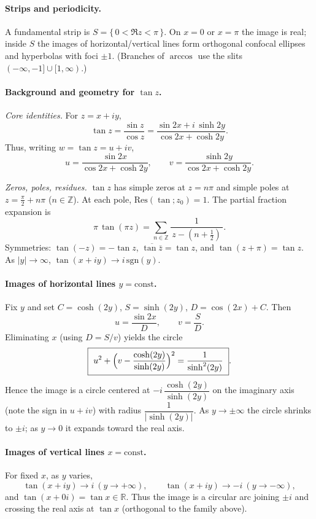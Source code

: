 \documentclass[11pt,a4paper]{article}
\theoremstyle{definition}
\theoremstyle{definition}
\theoremstyle{plain}
\theoremstyle{remark}
\begin{document}
\medskip
\paragraph{Strips and periodicity.}
A fundamental strip is $S=\{\,0<\Re z<\pi\,\}$. On $x=0$ or $x=\pi$ the image is real; inside $S$ the images of horizontal/vertical lines form orthogonal confocal ellipses and hyperbolas with foci $\pm1$.
(Branches of $\arccos$ use the slits $(-\infty,-1]\cup[1,\infty)$.)
	
	
\paragraph{Background and geometry for $\tan z$.}

\emph{Core identities.} For $z=x+iy$,
\[
\tan z=\frac{\sin z}{\cos z}
=\frac{\sin 2x + i\,\sinh 2y}{\cos 2x+\cosh 2y}.
\]
Thus, writing $w=\tan z=u+iv$,
\[
u=\frac{\sin 2x}{\cos 2x+\cosh 2y},\qquad
v=\frac{\sinh 2y}{\cos 2x+\cosh 2y}.
\]

\emph{Zeros, poles, residues.}
$\tan z$ has simple zeros at $z=n\pi$ and simple poles at $z=\tfrac{\pi}{2}+n\pi$ ($n\in\mathbb Z$).
At each pole, $\mathrm{Res}(\tan;z_0)=1$. The partial fraction expansion is
\[
\pi\,\tan(\pi z)=\sum_{n\in\mathbb Z}\frac{1}{\,z-(n+\tfrac12)\,}.
\]
Symmetries: $\tan(-z)=-\tan z$, $\overline{\tan\bar z}=\tan z$, and $\tan(z+\pi)=\tan z$.
As $|y|\to\infty$, $\tan(x+iy)\to i\,\mathrm{sgn}(y)$.

\medskip
\paragraph{Images of horizontal lines $y=\text{const}$.}
Fix $y$ and set $C=\cosh(2y)$, $S=\sinh(2y)$, $D=\cos(2x)+C$. Then
\[
u=\frac{\sin 2x}{D},\qquad v=\frac{S}{D}.
\]
Eliminating $x$ (using $D=S/v$) yields the circle
\[
\boxed{\ u^{2}+\Bigl(v-\frac{\cosh(2y)}{\sinh(2y)}\Bigr)^{2}=\frac{1}{\sinh^{2}(2y)}\ }.
\]
Hence the image is a circle centered at $-i\,\dfrac{\cosh(2y)}{\sinh(2y)}$ on the imaginary axis (note the sign in $u+iv$) with radius $\dfrac{1}{|\sinh(2y)|}$.
As $y\to\pm\infty$ the circle shrinks to $\pm i$; as $y\to0$ it expands toward the real axis.

\medskip
\paragraph{Images of vertical lines $x=\text{const}$.}
For fixed $x$, as $y$ varies,
\[
\tan(x+iy)\to i \ (y\to+\infty),\qquad \tan(x+iy)\to -i \ (y\to-\infty),
\]
and $\tan(x+0i)=\tan x\in\mathbb R$. Thus the image is a circular arc joining $\pm i$ and crossing the real axis at $\tan x$ (orthogonal to the family above).
\end{document}
